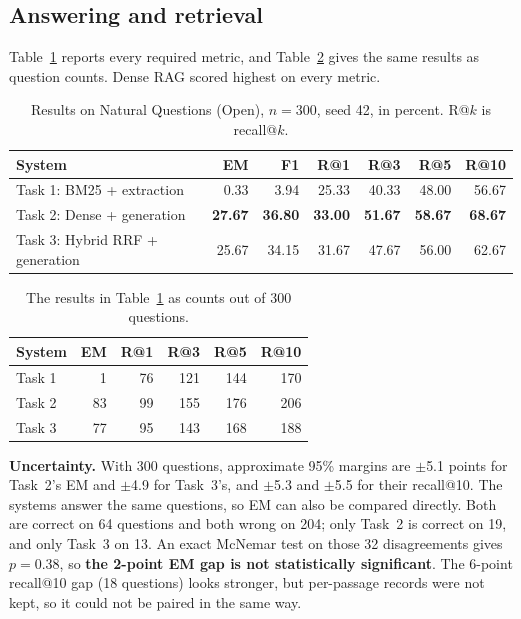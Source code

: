\documentclass[11pt,a4paper]{article}
\begin{document}
\subsection{Answering and retrieval}
Table~\ref{tab:results} reports every required metric, and Table~\ref{tab:counts} gives the same results as question counts. Dense RAG scored highest on every metric.

\begin{table}[ht]
\centering
\begin{tabular}{@{}lrrrrrr@{}}
\toprule
System & EM & F1 & R@1 & R@3 & R@5 & R@10 \\
\midrule
Task 1: BM25 + extraction & 0.33 & 3.94 & 25.33 & 40.33 & 48.00 & 56.67 \\
Task 2: Dense + generation & \textbf{27.67} & \textbf{36.80} & \textbf{33.00} & \textbf{51.67} & \textbf{58.67} & \textbf{68.67} \\
Task 3: Hybrid RRF + generation & 25.67 & 34.15 & 31.67 & 47.67 & 56.00 & 62.67 \\
\bottomrule
\end{tabular}
\caption{Results on Natural Questions (Open), $n=300$, seed 42, in percent. R@$k$ is recall@$k$.}
\label{tab:results}
\end{table}

\begin{table}[ht]
\centering
\begin{tabular}{@{}lrrrrr@{}}
\toprule
System & EM & R@1 & R@3 & R@5 & R@10 \\
\midrule
Task 1 & 1 & 76 & 121 & 144 & 170 \\
Task 2 & 83 & 99 & 155 & 176 & 206 \\
Task 3 & 77 & 95 & 143 & 168 & 188 \\
\bottomrule
\end{tabular}
\caption{The results in Table~\ref{tab:results} as counts out of 300 questions.}
\label{tab:counts}
\end{table}

\textbf{Uncertainty.} With 300 questions, approximate 95\% margins are $\pm$5.1 points for Task~2's EM and $\pm$4.9 for Task~3's, and $\pm$5.3 and $\pm$5.5 for their recall@10. The systems answer the same questions, so EM can also be compared directly. Both are correct on 64 questions and both wrong on 204; only Task~2 is correct on 19, and only Task~3 on 13. An exact McNemar test on those 32 disagreements gives $p=0.38$, so \textbf{the 2-point EM gap is not statistically significant}. The 6-point recall@10 gap (18 questions) looks stronger, but per-passage records were not kept, so it could not be paired in the same way.
\end{document}
